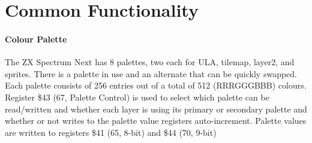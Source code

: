 \section{Common Functionality}

\paragraph{Colour Palette}

The ZX Spectrum Next has 8 palettes, two each for ULA, tilemap,
layer2, and sprites.  There is a palette in use and an alternate that
can be quickly swapped.  Each palette consists of 256 entries out of a
total of 512 (RRRGGGBBB) colours.  Register \$43 (67, Palette Control)
is used to select which palette can be read/written and whether each
layer is using its primary or secondary palette and whether or not
writes to the palette value registers auto-increment. Palette values
are written to registers \$41 (65, 8-bit) and \$44 (70, 9-bit)

